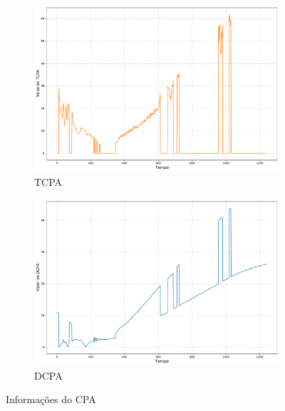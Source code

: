         \begin{figure}[H]
		\centering
		\begin{subfigure}{1\textwidth}
            \centering
            \includegraphics[width=\textwidth]{fig/chap5/headon_tcpa.pdf}
            \caption{TCPA}
            \label{fig:chap5_headon_tcpa}
        \end{subfigure}
        \begin{subfigure}{1\textwidth}
            \centering
            \includegraphics[width=\textwidth]{fig/chap5/headon_dcpa.pdf}
            \caption{DCPA}
            \label{fig:chap5_headon_dcpa}
        \end{subfigure}
        
        \caption{Informações do CPA}
        \label{fig:chap5_headon_cpa}
        \end{figure}
        
